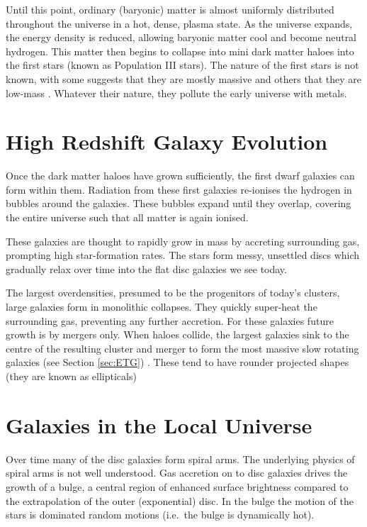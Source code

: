 	Until this point, ordinary (baryonic) matter is almost uniformly distributed throughout the universe in a hot, dense, plasma state. As the universe expands, the energy density is reduced, allowing baryonic matter cool and become neutral hydrogen. This matter then begins to collapse into mini dark matter haloes into the first stars (known as Population III stars). The nature of the first stars is not known, with some suggests that they are mostly massive \citep[e.g.][and the references therein]{Bromm2011} and others that they are low-mass \citep[e.g.][]{Stacy2014}. Whatever their nature, they pollute the early universe with metals. 

\section{High Redshift Galaxy Evolution}
	Once the dark matter haloes have grown sufficiently, the first dwarf galaxies can form within them. Radiation from these first galaxies re-ionises the hydrogen in bubbles around the galaxies. These bubbles expand until they overlap, covering the entire universe such that all matter is again ionised. 

	These galaxies are thought to rapidly grow in mass by accreting surrounding gas, prompting high star-formation rates. The stars form messy, unsettled discs which gradually relax over time into the flat disc galaxies we see today.

	The largest overdensities, presumed to be the progenitors of today's clusters, large galaxies form in monolithic collapses. They quickly super-heat the surrounding gas, preventing any further accretion. For these galaxies future growth is by mergers only. When haloes collide, the largest galaxies sink to the centre of the resulting cluster and merger to form the most massive slow rotating galaxies (see Section \ref{sec:ETG}) \citep[e.g.][fig.30]{Cappellari2016}. These tend to have rounder projected shapes (they are known as ellipticals)

\section{Galaxies in the Local Universe}
	Over time many of the disc galaxies form spiral arms. The underlying physics of spiral arms is not well understood. Gas accretion on to disc galaxies drives the growth of a bulge, a central region of enhanced surface brightness compared to the extrapolation of the outer (exponential) disc. In the bulge the motion of the stars is dominated random motions (i.e.\ the bulge is dynamically hot). 

